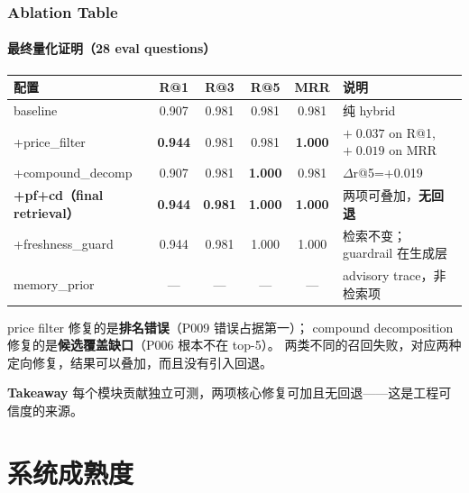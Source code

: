 \documentclass[aspectratio=169,10pt]{beamer}
\newcommand{\takeaway}[1]{%
  \vfill%
  \begin{tcolorbox}[
    colback=Ctakebg, colframe=Ctakebg,
    arc=0pt, boxrule=0pt,
    left=7pt, right=7pt, top=4pt, bottom=4pt,
    width=\textwidth, nobeforeafter
  ]%
    {\scriptsize\color{white}\textbf{Takeaway}\enspace%
     \color{white!88!Ctakebg}#1}%
  \end{tcolorbox}%
}
\newcommand{\hi}[1]{{\bfseries\color{Cgreen}#1}}      %
\begin{document}
\begin{frame}
\frametitle{Ablation Table}
\framesubtitle{最终量化证明（28 eval questions）}

{\footnotesize\renewcommand{\arraystretch}{1.18}
\begin{tabularx}{\textwidth}{lccccX}
\toprule
\bfseries 配置 & \bfseries R@1 & \bfseries R@3 & \bfseries R@5 & \bfseries MRR & \bfseries 说明 \\
\midrule
baseline               & 0.907 & 0.981 & 0.981 & 0.981 & 纯 hybrid \\
\rowcolor{Cgraylt}
+price\_filter         & \hi{0.944} & 0.981 & 0.981 & \hi{1.000} & $+\;0.037$ on R@1,\ $+\;0.019$ on MRR \\
+compound\_decomp      & 0.907 & 0.981 & \hi{1.000} & 0.981 & $\Delta$r@5=+0.019 \\
\rowcolor{Cgreelt}
\bfseries +pf+cd（final retrieval） & \hi{\bfseries 0.944} & \bfseries 0.981 & \hi{\bfseries 1.000} & \hi{\bfseries 1.000} & 两项可叠加，\hi{无回退} \\
+freshness\_guard      & 0.944 & 0.981 & 1.000 & 1.000 & 检索不变；guardrail 在生成层 \\
\rowcolor{Cgraylt}
memory\_prior          & — & — & — & — & advisory trace，非检索项 \\
\bottomrule
\end{tabularx}}

\vspace{0.12cm}
\begin{tcolorbox}[tcblue]
\footnotesize
price filter 修复的是\textbf{排名错误}（P009 错误占据第一）；  
compound decomposition 修复的是\textbf{候选覆盖缺口}（P006 根本不在 top-5）。  
两类不同的召回失败，对应两种定向修复，结果可以叠加，而且没有引入回退。
\end{tcolorbox}

\takeaway{每个模块贡献独立可测，两项核心修复可加且无回退——这是工程可信度的来源。}
\end{frame}


\section{系统成熟度}
\end{document}
